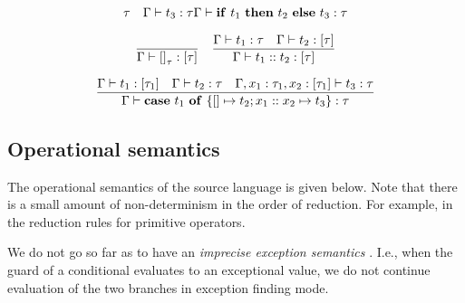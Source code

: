 \documentclass{llncs}
\newcommand{\RulX}[3]{\frac{#2}{#3}}
\newcommand{\Tm}{t}
\newcommand{\TmVar}{x}
\newcommand{\TmIf}[3]{\mathbf{if}\ #1\ \mathbf{then}\ #2\ \mathbf{else}\ #3}
\newcommand{\TmNil}[1]{\left[\right]_{#1}}
\newcommand{\TmCons}[2]{#1 :: #2}
\newcommand{\TmCase}[5]{\mathbf{case}\ #1\ \mathbf{of}\ \{\left[\right]\mapsto #2; #3 :: #4 \mapsto #5\}}
\newcommand{\Ty}{\tau}
\newcommand{\TyList}[1]{\left[#1\right]}
\newcommand{\TyEnv}{\Gamma}
\newcommand{\JudgeTy}[3]{{#1 \vdash #2 : #3}}
\begin{document}
\begin{gather*}
{                      {\Ty}
              \quad
              \JudgeTy{\TyEnv}
                      {\Tm_3}
                      {\Ty}
             }
             {\JudgeTy{\TyEnv}
                      {\TmIf{\Tm_1}{\Tm_2}{\Tm_3}}
                      {\Ty}
             }             
        \\[1.5ex]
        \RulX{U-Nil}
             {}
             {\JudgeTy{\TyEnv}
                      {\TmNil{\Ty}}
                      {\TyList{\Ty}}
             }
        \quad
        \RulX{U-Cons}
             {\JudgeTy{\TyEnv}
                      {\Tm_1}
                      {\Ty}
              \quad
              \JudgeTy{\TyEnv}
                      {\Tm_2}
                      {\TyList{\Ty}}
             }
             {\JudgeTy{\TyEnv}
                      {\TmCons{\Tm_1}{\Tm_2}}
                      {\TyList{\Ty}}
             }
        \\[1.5ex]
        \RulX{U-Case}
             {%
                  \JudgeTy{\TyEnv}
                          {\Tm_1}
                          {\TyList{\Ty_1}}
                  \quad
                  \JudgeTy{\TyEnv}
                          {\Tm_2}
                          {\Ty}
                  \quad
                  \JudgeTy{\TyEnv, \TmVar_1 : \Ty_1, \TmVar_2 : \TyList{\Ty_1}}
                          {\Tm_3}
                          {\Ty}
             }
             {\JudgeTy{\TyEnv}
                      {\TmCase{\Tm_1}{\Tm_2}{\TmVar_1}{\TmVar_2}{\Tm_3}}
                      {\Ty}
             }
    \end{gather*}

\subsection{Operational semantics}

The operational semantics of the source language is given below. Note that there is a small amount of non-determinism in the order of reduction. For example, in the reduction rules for primitive operators.

We do not go so far as to have an \emph{imprecise exception semantics} \cite{PeytonJones:1999:SIE:301618.301637}. I.e., when the guard of a conditional evaluates to an exceptional value, we do not continue evaluation of the two branches in exception finding mode.
\end{document}
